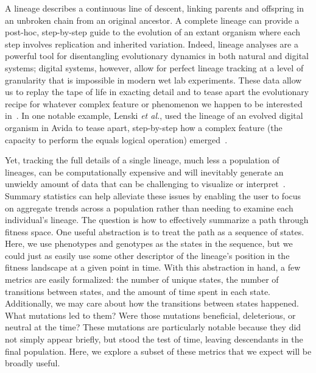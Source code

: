 \documentclass[letterpaper]{article}
\begin{document}
A lineage describes a continuous line of descent, linking %
parents and offspring in an unbroken chain from an original ancestor.
A complete lineage can provide a post-hoc, step-by-step guide to the evolution of an extant organism where each step involves replication and inherited variation. Indeed, lineage analyses are a powerful tool for disentangling evolutionary dynamics in both natural and digital systems; digital systems, however, allow for 
perfect lineage tracking at a level of granularity that is
impossible in modern wet lab experiments.  These data allow us to replay the tape of life in exacting detail and to tease apart the evolutionary recipe for whatever complex feature or phenomenon we happen to be interested in~\citep{mcphee_using_2016}. 
In 
one notable
example, Lenski \textit{et al.}, used the lineage of an evolved digital organism in Avida to tease apart, step-by-step how a complex feature (the capacity to perform the equals logical operation) emerged~\citep{lenski_evolutionary_2003}. %

Yet, tracking the full details of a single lineage, much less a population of lineages, can be computationally expensive and will inevitably generate an unwieldy amount of data that can be challenging to visualize or interpret~\citep{mcphee_visualizing_2016}.
Summary statistics can help alleviate these issues by enabling the user to focus on aggregate trends across a population rather than needing to examine each individual's lineage. The question is how to effectively summarize %
a path through fitness space. One useful abstraction is to treat the path as a sequence of states. Here, we use phenotypes and genotypes as the states in the sequence, but we could just as easily use some other descriptor of the lineage's position in the fitness landscape at a given point in time.
With this abstraction in hand, a few metrics are easily formalized: the number of unique states, the number of transitions between states, and the amount of time spent in each state.
Additionally, we may care about how the transitions between states happened. What mutations led to them? Were those mutations beneficial, deleterious, or neutral at the time? These mutations are particularly notable because they did not simply appear briefly, but stood the test of time, leaving descendants in the final population.
Here, we explore a subset of these metrics that we expect will be broadly useful.
\end{document}
